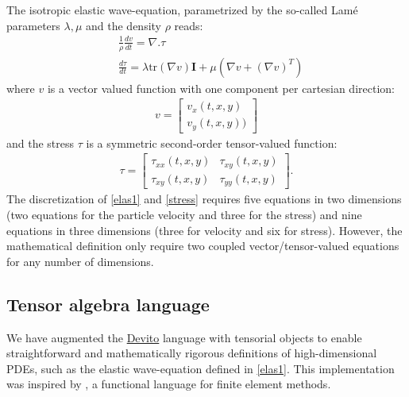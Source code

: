 \documentclass[conference]{IEEEtran}
\begin{document}
The isotropic elastic wave-equation, parametrized by the so-called Lamé parameters
$\lambda, \mu$ and the density $\rho$ reads:
%
\begin{equation}
\begin{aligned}
&\frac{1}{\rho}\frac{dv}{dt} = \nabla . \tau \\
&\frac{d \tau}{dt} = \lambda \mathrm{tr}(\nabla v) \mathbf{I}  + \mu (\nabla v + (\nabla v)^T)
\end{aligned}
\label{elas1}
\end{equation}
%
 where $v$ is a vector valued function with one component per cartesian
direction:
%
\begin{equation}
\begin{split}
v =  \begin{bmatrix} v_x(t, x, y) \\ v_y(t, x, y)) \end{bmatrix}
\end{split}
\label{partvel}
\end{equation}
%
 and the stress $\tau$ is a symmetric second-order tensor-valued
function:
%
\begin{equation}
\begin{aligned}
    \tau = \begin{bmatrix}\tau_{xx}(t, x, y) & \tau_{xy}(t, x, y)\\\tau_{xy}(t, x, y) & \tau_{yy}(t, x, y)\end{bmatrix}.
\end{aligned}
\label{stress}
\end{equation}
%
 The discretization of \eqref{elas1} and \eqref{stress} requires five
equations in two dimensions (two equations for the particle velocity and
three for the stress) and nine equations in three dimensions (three for velocity
and six for stress). However, the mathematical
definition only require two coupled vector/tensor-valued equations for
any number of dimensions.

\subsection{Tensor algebra language}\label{tensor-algebra-language}

We have augmented the \href{https://github.com/devitocodes/devito}{Devito} language with tensorial objects to enable
straightforward and mathematically rigorous definitions of
high-dimensional PDEs, such as the elastic wave-equation defined in
\eqref{elas1}. This implementation was inspired by \cite{ufl}, a
functional language for finite element methods.
\end{document}
